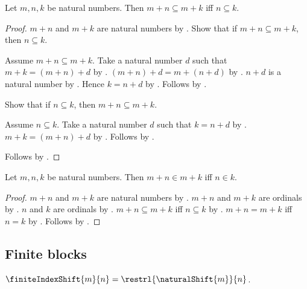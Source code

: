 \begin{theorem}\label{natural_addition_subseteq_iff}
    Let $m,n,k$ be natural numbers.
    Then $m+n\subseteq m+k$ iff $n\subseteq k$.
\end{theorem}
\begin{proof}
    $m+n$ and $m+k$ are natural numbers by .
    Show that if $m+n\subseteq m+k$, then $n\subseteq k$.
    \begin{subproof}
        Assume $m+n\subseteq m+k$.
        Take a natural number $d$ such that $m+k=(m+n)+d$ by
            .
        $(m+n)+d=m+(n+d)$ by .
        $n+d$ is a natural number by .
        Hence $k=n+d$ by .
        Follows by .
    \end{subproof}
    Show that if $n\subseteq k$, then $m+n\subseteq m+k$.
    \begin{subproof}
        Assume $n\subseteq k$.
        Take a natural number $d$ such that $k=n+d$ by .
        $m+k=(m+n)+d$ by .
        Follows by .
    \end{subproof}
    Follows by \auto.
\end{proof}

\begin{theorem}\label{natural_addition_membership_iff}
    Let $m,n,k$ be natural numbers.
    Then $m+n\in m+k$ iff $n\in k$.
\end{theorem}
\begin{proof}
    $m+n$ and $m+k$ are natural numbers by .
    $m+n$ and $m+k$ are ordinals by .
    $n$ and $k$ are ordinals by .
    $m+n\subseteq m+k$ iff $n\subseteq k$ by .
    $m+n=m+k$ iff $n=k$ by .
    Follows by .
\end{proof}

\subsection{Finite blocks}

\begin{definition}\label{finite_index_shift}
    $\finiteIndexShift{m}{n}=\restrl{\naturalShift{m}}{n}$.
\end{definition}

